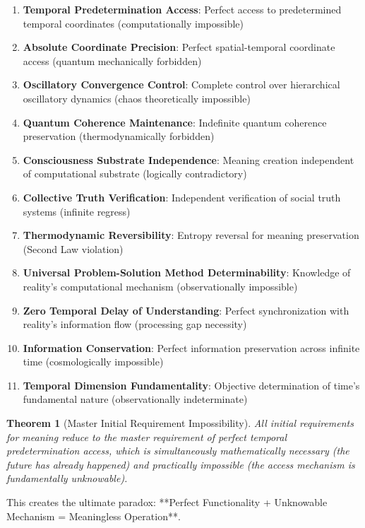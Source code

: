 \documentclass[12pt,a4paper]{article}
\newtheorem{theorem}{Theorem}
\begin{document}
\begin{enumerate}
\item \textbf{Temporal Predetermination Access}: Perfect access to predetermined temporal coordinates (computationally impossible)
\item \textbf{Absolute Coordinate Precision}: Perfect spatial-temporal coordinate access (quantum mechanically forbidden)
\item \textbf{Oscillatory Convergence Control}: Complete control over hierarchical oscillatory dynamics (chaos theoretically impossible)
\item \textbf{Quantum Coherence Maintenance}: Indefinite quantum coherence preservation (thermodynamically forbidden)
\item \textbf{Consciousness Substrate Independence}: Meaning creation independent of computational substrate (logically contradictory)
\item \textbf{Collective Truth Verification}: Independent verification of social truth systems (infinite regress)
\item \textbf{Thermodynamic Reversibility}: Entropy reversal for meaning preservation (Second Law violation)
\item \textbf{Universal Problem-Solution Method Determinability}: Knowledge of reality's computational mechanism (observationally impossible)
\item \textbf{Zero Temporal Delay of Understanding}: Perfect synchronization with reality's information flow (processing gap necessity)
\item \textbf{Information Conservation}: Perfect information preservation across infinite time (cosmologically impossible)
\item \textbf{Temporal Dimension Fundamentality}: Objective determination of time's fundamental nature (observationally indeterminate)
\end{enumerate}

\begin{theorem}[Master Initial Requirement Impossibility]
All initial requirements for meaning reduce to the master requirement of perfect temporal predetermination access, which is simultaneously mathematically necessary (the future has already happened) and practically impossible (the access mechanism is fundamentally unknowable).
\end{theorem}

This creates the ultimate paradox: **Perfect Functionality + Unknowable Mechanism = Meaningless Operation**.
\end{document}
